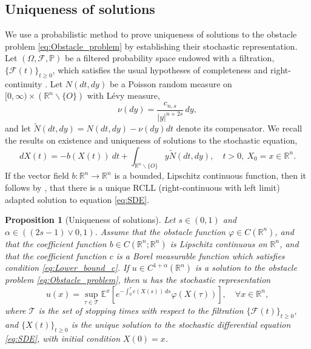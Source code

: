 \documentclass[11pt,reqno]{amsart}
\newtheorem{prop}[thm]{Proposition}
\theoremstyle{definition}
\theoremstyle{remark}
\begin{document}
\subsection{Uniqueness of solutions}
\label{sec:Uniqueness}
We use a probabilistic method to prove uniqueness of solutions to the obstacle problem \eqref{eq:Obstacle_problem} by establishing their stochastic representation. Let $(\Omega, {{\mathcal{F}}}, {\mathbb{P}})$ be a filtered probability space endowed with a filtration, $\{{{\mathcal{F}}}(t)\}_{t\geq 0}$, which satisfies the usual hypotheses of completeness and right-continuity \cite[p. 72]{Applebaum}. Let $N(dt,dy)$ be a Poisson random measure on $[0,\infty)\times({\mathbb{R}}^n\backslash\{O\})$ with L\'evy measure, 
\begin{equation}
\label{eq:Levy_measure}
\nu(dy)=\frac{c_{n,s}}{|y|^{n+2s}}\, dy,
\end{equation}
and let $\widetilde N(dt, dy)=N(dt, dy) - \nu(dy)dt$ denote its compensator. We recall the results on existence and uniqueness of solutions to the stochastic equation,
\begin{equation}
\label{eq:SDE}
dX(t)=-b(X(t))\ dt+\int_{{\mathbb{R}}^n\backslash\{O\}} y \widetilde N(dt,dy),\quad t>0,\ X_0=x \in{\mathbb{R}}^n.
\end{equation}
If the vector field $b:{\mathbb{R}}^n\rightarrow{\mathbb{R}}^n$ is a bounded, Lipschitz continuous function, then it follows by \cite[Theorem 6.2.9]{Applebaum}, that there is a unique RCLL (right-continuous with left limit) adapted solution to equation \eqref{eq:SDE}.

\begin{prop}[Uniqueness of solutions]
\label{prop:Uniqueness}
Let $s\in (0,1)$ and $\alpha\in((2s-1)\vee 0,1)$. Assume that the obstacle function $\varphi \in C({\mathbb{R}}^n)$, and that the coefficient function $b\in C({\mathbb{R}}^n;{\mathbb{R}}^n)$ is Lipschitz continuous on ${\mathbb{R}}^n$, and that the coefficient function $c$ is a Borel measurable function which satisfies condition \eqref{eq:Lower_bound_c}. If $u \in C^{1+\alpha}({\mathbb{R}}^n)$ is a solution to the obstacle problem \eqref{eq:Obstacle_problem}, then $u$ has the stochastic representation
\begin{equation}
\label{eq:Stochastic_representation}
u(x)=\sup_{\tau\in{{\mathcal{T}}}} {\mathbb{E}}^x\left[e^{-\int_0^{\tau} c(X(s))\, ds} \varphi(X(\tau))\right],\quad\forall x\in{\mathbb{R}}^n,
\end{equation}
where ${{\mathcal{T}}}$ is the set of stopping times with respect to the filtration $\{{{\mathcal{F}}}(t)\}_{t\geq 0}$, and $\{X(t)\}_{t\geq 0}$ is the unique solution to the stochastic differential equation \eqref{eq:SDE}, with initial condition $X(0)=x$.
\end{prop}
\end{document}
